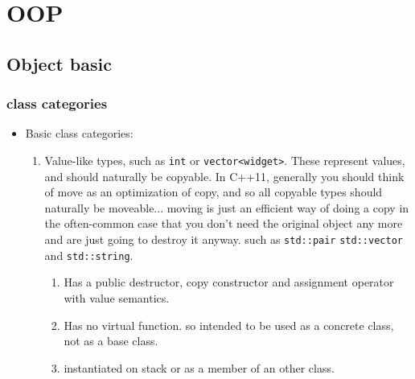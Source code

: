 \documentclass[a4paper,11pt,twoside]{book}
\begin{document}
\chapter{OOP}

\section{Object basic}

\subsection{class categories}
\begin{itemize}
	\item Basic class categories:
	\begin{enumerate}
			
		\item Value-like types, such as \texttt{int} or \texttt{vector<widget>}. These represent values, and should naturally be copyable. In C++11, generally you should think of move as an optimization of copy, and so all copyable types should naturally be moveable... moving is just an efficient way of doing a copy in the often-common case that you don't need the original object any more and are just going to destroy it anyway. such as \texttt{std::pair} \texttt{std::vector} and \texttt{std::string}.
		
		\begin{enumerate}
			\item Has a public destructor, copy constructor and assignment operator with value semantics.
			\item Has no virtual function. so intended to be used as a concrete class, not as a base class.
			\item instantiated on stack or as a member of an other class.
		\end{enumerate}
		

\end{enumerate}
\end{itemize}
\end{document}
